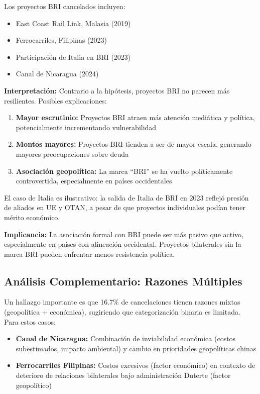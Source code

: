 \documentclass[12pt]{article}
\begin{document}
Los proyectos BRI cancelados incluyen:
\begin{itemize}
    \item East Coast Rail Link, Malasia (2019)
    \item Ferrocarriles, Filipinas (2023)
    \item Participación de Italia en BRI (2023)
    \item Canal de Nicaragua (2024)
\end{itemize}

\textbf{Interpretación:} Contrario a la hipótesis, proyectos BRI no parecen más resilientes. Posibles explicaciones:

\begin{enumerate}
    \item \textbf{Mayor escrutinio:} Proyectos BRI atraen más atención mediática y política, potencialmente incrementando vulnerabilidad
    \item \textbf{Montos mayores:} Proyectos BRI tienden a ser de mayor escala, generando mayores preocupaciones sobre deuda
    \item \textbf{Asociación geopolítica:} La marca ``BRI'' se ha vuelto políticamente controvertida, especialmente en países occidentales
\end{enumerate}

El caso de Italia es ilustrativo: la salida de Italia de BRI en 2023 reflejó presión de aliados en UE y OTAN, a pesar de que proyectos individuales podían tener mérito económico.

\textbf{Implicancia:} La asociación formal con BRI puede ser más pasivo que activo, especialmente en países con alineación occidental. Proyectos bilaterales sin la marca BRI pueden enfrentar menos resistencia política.

\subsection{Análisis Complementario: Razones Múltiples}

Un hallazgo importante es que 16.7\% de cancelaciones tienen razones mixtas (geopolítica + económica), sugiriendo que categorización binaria es limitada. Para estos casos:

\begin{itemize}
    \item \textbf{Canal de Nicaragua:} Combinación de inviabilidad económica (costos subestimados, impacto ambiental) y cambio en prioridades geopolíticas chinas
    \item \textbf{Ferrocarriles Filipinas:} Costos excesivos (factor económico) en contexto de deterioro de relaciones bilaterales bajo administración Duterte (factor geopolítico)
\end{itemize}
\end{document}
